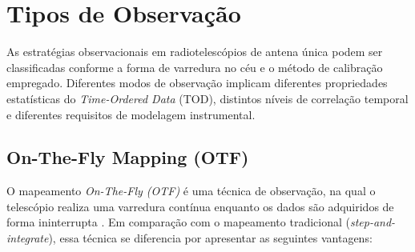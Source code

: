 \section{Tipos de Observação \label{tipo_de_obeservação}}
As estratégias observacionais em radiotelescópios de antena única podem ser classificadas conforme a forma de varredura no céu e o método de calibração empregado. Diferentes modos de observação implicam diferentes propriedades estatísticas do \textit{Time-Ordered Data} (TOD), distintos níveis de correlação temporal e diferentes requisitos de modelagem instrumental.
\subsection{On-The-Fly Mapping (OTF)}

O mapeamento \textit{On-The-Fly (OTF)} é uma técnica de observação, na qual o telescópio realiza uma varredura contínua enquanto os dados são adquiridos de forma ininterrupta \cite{GBTog2011_green, MangumEmersonGreisen2007_on_the_fly}. Em comparação com o mapeamento tradicional (\textit{step-and-integrate}), essa técnica se diferencia por apresentar as seguintes vantagens:

